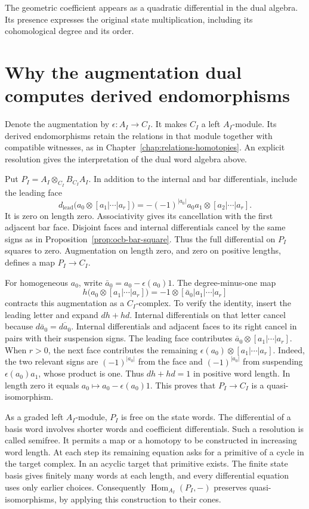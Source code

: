 The geometric coefficient appears as a quadratic differential in
the dual algebra. Its presence expresses the original state
multiplication, including its cohomological degree and its order.

\section{Why the augmentation dual computes derived endomorphisms}

Denote the augmentation by $\epsilon:A_I\to C_I$.
It makes $C_I$ a left $A_I$-module.
Its derived endomorphisms retain the relations in that module
together with compatible witnesses, as in
Chapter~\ref{chap:relations-homotopies}.
An explicit resolution gives the interpretation of the dual word
algebra above.

Put $P_I=A_I\otimes_{C_I}B_{C_I}A_I$.
In addition to the internal and bar differentials, include the
leading face
\[
 d_{\mathrm{lead}}\bigl(a_0\otimes[a_1|\cdots|a_r]\bigr)
 =-(-1)^{|a_0|}a_0a_1\otimes[a_2|\cdots|a_r].
\]
It is zero on length zero.
Associativity gives its cancellation with the first adjacent bar
face. Disjoint faces and internal differentials cancel by the
same signs as in Proposition~\ref{prop:ocb-bar-square}.
Thus the full differential on $P_I$ squares to zero.
Augmentation on length zero, and zero on positive lengths,
defines a map $P_I\to C_I$.

For homogeneous $a_0$, write
$\bar a_0=a_0-\epsilon(a_0)1$.
The degree-minus-one map
\[
 h\bigl(a_0\otimes[a_1|\cdots|a_r]\bigr)
 =-1\otimes[\bar a_0|a_1|\cdots|a_r]
\]
contracts this augmentation as a $C_I$-complex.
To verify the identity, insert the leading letter and expand
$dh+hd$.
Internal differentials on that letter cancel because
$d\bar a_0=\overline{da_0}$.
Internal differentials and adjacent faces to its right cancel
in pairs with their suspension signs.
The leading face contributes
$\bar a_0\otimes[a_1|\cdots|a_r]$.
When $r>0$, the next face contributes the remaining
$\epsilon(a_0)\otimes[a_1|\cdots|a_r]$.
Indeed, the two relevant signs are $(-1)^{|a_0|}$ from the face
and $(-1)^{|a_0|}$ from suspending
$\epsilon(a_0)a_1$, whose product is one.
Thus $dh+hd=1$ in positive word length.
In length zero it equals $a_0\mapsto a_0-\epsilon(a_0)1$.
This proves that $P_I\to C_I$ is a quasi-isomorphism.

As a graded left $A_I$-module, $P_I$ is free on the state words.
The differential of a basis word involves shorter words and
coefficient differentials.
Such a resolution is called semifree.
It permits a map or a homotopy to be constructed in increasing
word length. At each step its remaining equation asks for a
primitive of a cycle in the target complex.
In an acyclic target that primitive exists.
The finite state basis gives finitely many words at each length,
and every differential equation uses only earlier choices.
Consequently $\operatorname{Hom}_{A_I}(P_I,-)$ preserves
quasi-isomorphisms, by applying this construction to their cones.

